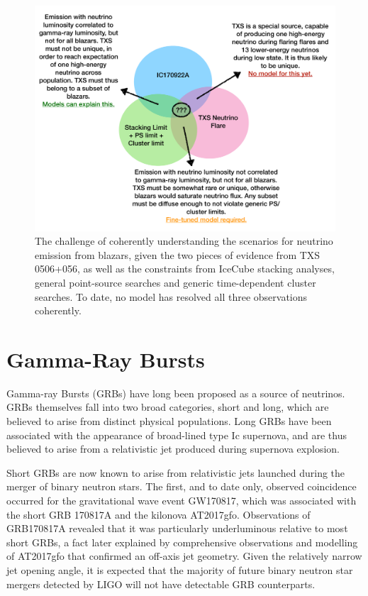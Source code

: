  \begin{figure}[!ht]
 	\centering \includegraphics{txs_logic}
 	\caption{The challenge of coherently understanding the scenarios for neutrino emission from blazars, given the two pieces of evidence from TXS 0506+056, as well as the constraints from IceCube stacking analyses, general point-source searches and generic time-dependent cluster searches. To date, no model has resolved all three observations coherently.}
 	\label{fig:TXSLogic}
 \end{figure}
\section{Gamma-Ray Bursts}

Gamma-ray Bursts (GRBs) have long been proposed as a source of neutrinos. GRBs themselves fall into two broad categories, short and long, which are believed to arise from distinct physical populations. Long GRBs have been associated with the appearance of broad-lined type Ic supernova, and are thus believed to arise from a relativistic jet produced during supernova explosion. 

Short GRBs are now known to arise from relativistic jets launched during the merger of binary neutron stars. The first, and to date only, observed coincidence occurred for the gravitational wave event GW170817, which was associated with the short GRB 170817A and the kilonova AT2017gfo. Observations of GRB170817A revealed that it was particularly underluminous relative to most short GRBs, a fact later explained by comprehensive observations and modelling of AT2017gfo that confirmed an off-axis jet geometry. Given the relatively narrow jet opening angle, it is expected that the majority of future binary neutron star mergers detected by LIGO will not have detectable GRB counterparts.

